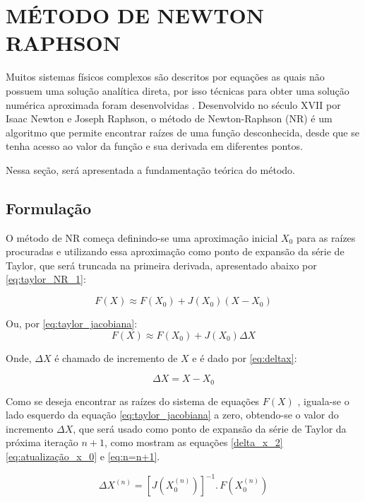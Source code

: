 \section{MÉTODO DE NEWTON RAPHSON}
Muitos sistemas físicos complexos são descritos por equações as quais não possuem uma solução analítica direta, por isso técnicas para obter uma solução numérica aproximada foram desenvolvidas \cite{Stagg}.
Desenvolvido no século XVII por Isaac Newton e Joseph Raphson, o método de Newton-Raphson (\acs{NR}) é um algoritmo que permite encontrar raízes de uma função desconhecida,  desde que se tenha acesso ao valor da função e sua derivada em diferentes pontos. 

Nessa seção, será apresentada a fundamentação teórica do método.
\subsection{Formulação}
O método de NR começa definindo-se uma aproximação inicial
$X_0$
para as raízes procuradas e utilizando essa aproximação como ponto de expansão da série de Taylor, que será truncada na primeira derivada, apresentado abaixo por \eqref{eq:taylor_NR_1}:

\begin{equation}\label{eq:taylor_NR_1}
    F(X) \approx F(X_0) + J(X_0)(X-X_0)
\end{equation}

Ou, por \eqref{eq:taylor_jacobiana}:
\begin{equation}\label{eq:taylor_jacobiana}
    F(X) \approx F(X_0) + J(X_0)\Delta X
\end{equation}

Onde, $\Delta X$ é chamado de incremento de $X$ e é dado por \eqref{eq:deltax}:

\begin{equation}\label{eq:deltax}
    \Delta X = X-X_0
\end{equation}

Como se deseja encontrar as raízes do sistema de equações 
$F(X)$
, iguala-se o lado esquerdo da equação \eqref{eq:taylor_jacobiana} a zero, obtendo-se o valor do incremento 
$\Delta X$, que será usado como ponto de expansão da série de Taylor da próxima iteração $n+1$, como mostram as equações \eqref{delta_x_2} \eqref{eq:atualização_x_0} e \eqref{eq:n=n+1}.

\begin{equation}\label{delta_x_2}
    \Delta X^{(n)} = [J(X_0^{(n)})]^{-1}.\,F(X_0^{(n)})
\end{equation}   

